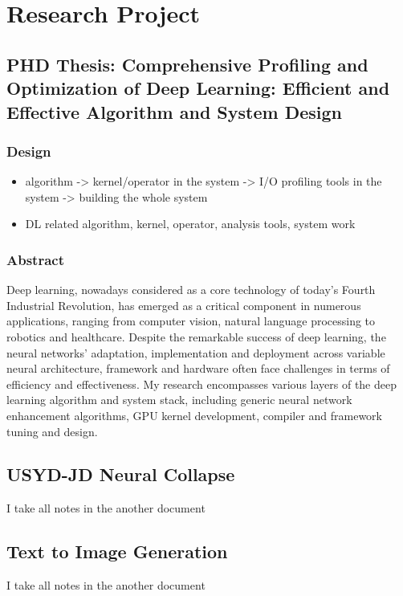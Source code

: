 \documentclass[UTF8]{article}
\begin{document}
\section{Research Project}
    
    \subsection{PHD Thesis: Comprehensive Profiling and Optimization of Deep Learning: Efficient and Effective Algorithm and System Design}
        \subsubsection{Design}
        \begin{itemize}
            \item algorithm -> kernel/operator in the system -> I/O profiling tools in the system -> building the whole system
            \item DL related algorithm, kernel, operator, analysis tools, system work
        \end{itemize}
        \subsubsection{Abstract}
            Deep learning, nowadays considered as a core technology of today’s Fourth Industrial Revolution, has emerged as a critical component in numerous applications, ranging from computer vision, natural language processing to robotics and healthcare. Despite the remarkable success of deep learning, the neural networks' adaptation, implementation and deployment across variable neural architecture, framework and hardware often face challenges in terms of efficiency and effectiveness. My research encompasses various layers of the deep learning algorithm and system stack, including generic neural network enhancement algorithms, GPU kernel development, compiler and framework tuning and design.
        
\subsection{USYD-JD Neural Collapse}
    I take all notes in the another document

\subsection{Text to Image Generation}
    I take all notes in the another document
\end{document}

